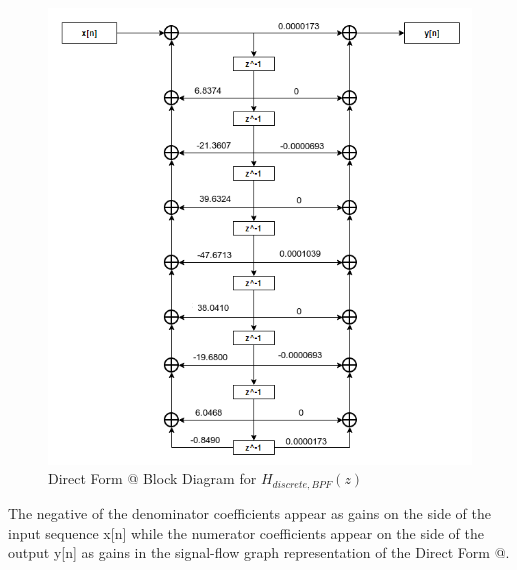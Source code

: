 \documentclass[12pt]{article}
\makeatletter
\newcommand{\Rmnum}[1]{\expandafter\@slowromancap\romannumeral #1@}
\makeatother
\begin{document}
\begin{figure}[h!]
	\centering	
	\includegraphics[width = 1\textwidth]{Chebyshev_DirectForm_2.png}
    \caption{Direct Form \Rmnum{2} Block Diagram for $H_{discrete,BPF}(z)$}
\end{figure}

The negative of the denominator coefficients appear as gains on the side of the input sequence x[n] while the numerator coefficients appear on the side of the output y[n] as gains in the signal-flow graph representation of the Direct Form \Rmnum{2}.
\end{document}
